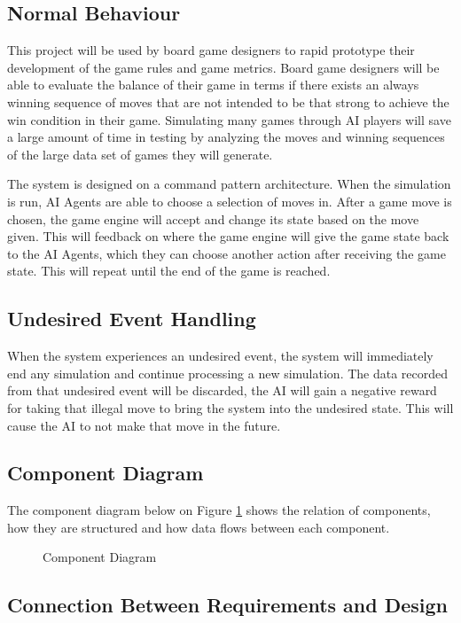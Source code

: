 \documentclass[12pt, titlepage]{article}
\begin{document}
\subsection{Normal Behaviour}
This project will be used by board game designers to rapid prototype their development of
the game rules and game metrics. Board game designers will be able to evaluate the balance
of their game in terms if there exists an always winning sequence of moves that are not
intended to be that strong to achieve the win condition in their game. Simulating many
games through AI players will save a large amount of time in testing by analyzing the moves
and winning sequences of the large data set of games they will generate.

The system is designed on a command pattern architecture. When the simulation is run,
AI Agents are able to choose a selection of moves in. After a game move is chosen, the
game engine will accept and change its state based on the move given. This will feedback
on where the game engine will give the game state back to the AI Agents, which they can
choose another action after receiving the game state. This will repeat until the end of the
game is reached.
\subsection{Undesired Event Handling}
When the system experiences an undesired event, the system will immediately end any
simulation and continue processing a new simulation. The data recorded from that undesired
event will be discarded, the AI will gain a negative reward for taking that illegal move to bring the system into the undesired state. This will cause the AI to not make that move in the future.

\subsection{Component Diagram}
The component diagram below on Figure \ref{FigCD} shows the relation of components, how they are structured and how data flows between each component. 
\begin{figure}[H]
\centering

\caption{Component Diagram}
\label{FigCD}
\end{figure}
\subsection{Connection Between Requirements and Design} \label{SecConnection}
\end{document}
